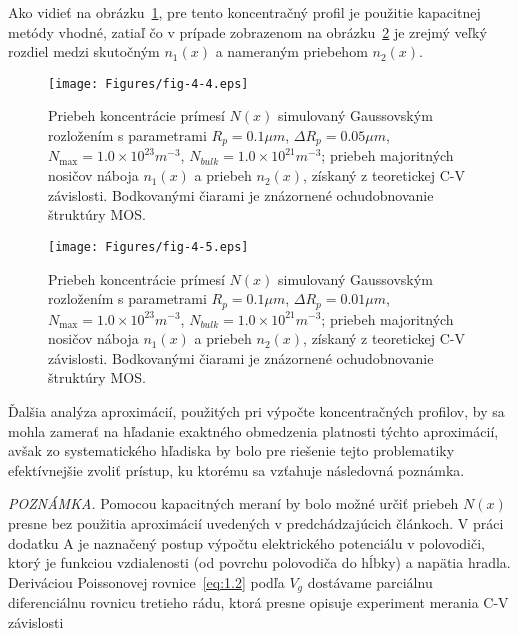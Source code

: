 \par Ako vidieť na obrázku~\ref{fig:4.4}, pre tento koncentračný
profil je použitie kapacitnej metódy vhodné, zatiaľ čo v prípade
zobrazenom na obrázku~\ref{fig:4.5} je zrejmý veľký rozdiel medzi
skutočným $n_{1}(x)$ a nameraným priebehom $n_{2}(x)$.

\begin{figure}[h!]\centering
  \texttt{[image: Figures/fig-4-4.eps]}
  \caption[Priebeh koncentrácie prímesí simulovaný Gaussovským
    rozložením]{Priebeh koncentrácie prímesí $N(x)$ simulovaný
    Gaussovským rozložením s parametrami $R_{p}=0.1\mu m$, $\Delta
    R_{p}=0.05\mu m$, $N_{\max}=1.0\times 10^{23} m^{-3}$,
    $N_{bulk}=1.0\times10^{21}m^{-3}$; priebeh majoritných nosičov
    náboja $n_{1}(x)$ a priebeh $n_{2}(x)$, získaný z teoretickej C-V
    závislosti. Bodkovanými čiarami je znázornené ochudobnovanie
    štruktúry MOS.}\label{fig:4.4}
\end{figure}

\begin{figure}[h!]\centering
  \texttt{[image: Figures/fig-4-5.eps]}
  \caption[Priebeh koncentrácie prímesí simulovaný Gaussovským
    rozložením]{Priebeh koncentrácie prímesí $N(x)$ simulovaný
    Gaussovským rozložením s parametrami $R_{p}=0.1\mu m$, $\Delta
    R_{p}=0.01\mu m$, $N_{\max}=1.0\times10^{23}m^{-3}$,
    $N_{bulk}=1.0\times10^{21}m^{-3}$; priebeh majoritných nosičov
    náboja $n_{1}(x)$ a priebeh $n_{2}(x)$, získaný z teoretickej C-V
    závislosti. Bodkovanými čiarami je znázornené ochudobnovanie
    štruktúry MOS.}\label{fig:4.5}
\end{figure}

\par Ďalšia analýza aproximácií, použitých pri výpočte koncentračných
profilov, by sa mohla zamerať na hľadanie exaktného obmedzenia
platnosti týchto aproximácií, avšak zo systematického hľadiska by bolo
pre riešenie tejto problematiky efektívnejšie zvoliť prístup, ku
ktorému sa vzťahuje následovná poznámka.

\par\emph{POZNÁMKA.} Pomocou kapacitných meraní by bolo možné určiť
priebeh $N(x)$ presne bez použitia aproximácií uvedených v
predchádzajúcich článkoch.  V práci~\cite{4.4} dodatku A je naznačený
postup výpočtu elektrického potenciálu v polovodiči, ktorý je funkciou
vzdialenosti (od povrchu polovodiča do hĺbky) a napätia hradla.
Deriváciou Poissonovej rovnice~\ref{eq:1.2} podľa $V_{g}$ dostávame
parciálnu diferenciálnu rovnicu tretieho rádu, ktorá presne opisuje
experiment merania C-V závislosti


